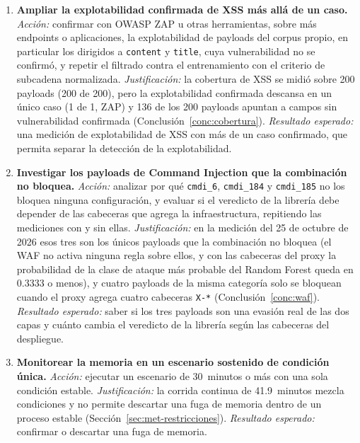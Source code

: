 \begin{enumerate}
        \item \textbf{Ampliar la explotabilidad confirmada de XSS más allá de un caso.}
    \textit{Acción:} confirmar con OWASP ZAP u otras herramientas, sobre más endpoints o
    aplicaciones, la explotabilidad de payloads del corpus propio, en particular los dirigidos a
    \texttt{content} y \texttt{title}, cuya vulnerabilidad no se confirmó, y repetir el filtrado
    contra el entrenamiento con el criterio de subcadena normalizada. \textit{Justificación:} la
    cobertura de XSS se midió sobre 200 payloads (200 de 200), pero la explotabilidad confirmada
    descansa en un único caso (1 de 1, ZAP) y 136 de los 200 payloads apuntan a campos sin
    vulnerabilidad confirmada (Conclusión~\ref{conc:cobertura}). \textit{Resultado esperado:} una
    medición de explotabilidad de XSS con más de un caso confirmado, que permita separar la
    detección de la explotabilidad.

    \item \textbf{Investigar los payloads de Command Injection que la combinación no bloquea.}
    \textit{Acción:} analizar por qué \texttt{cmdi\_6}, \texttt{cmdi\_184} y \texttt{cmdi\_185} no
    los bloquea ninguna configuración, y evaluar si el veredicto de la librería debe depender de
    las cabeceras que agrega la infraestructura, repitiendo las mediciones con y sin ellas.
    \textit{Justificación:} en la medición del 25 de octubre de 2026 esos tres son los únicos
    payloads que la combinación no bloquea (el WAF no activa ninguna regla sobre ellos, y con las
    cabeceras del proxy la probabilidad de la clase de ataque más probable del Random Forest queda
    en 0.3333 o menos), y cuatro payloads de la misma categoría solo se bloquean cuando el proxy
    agrega cuatro cabeceras \texttt{X-*} (Conclusión~\ref{conc:waf}). \textit{Resultado esperado:}
    saber si los tres payloads son una evasión real de las dos capas y cuánto cambia el veredicto
    de la librería según las cabeceras del despliegue.

    \item \textbf{Monitorear la memoria en un escenario sostenido de condición única.}
    \textit{Acción:} ejecutar un escenario de 30~minutos o más con una sola condición estable.
    \textit{Justificación:} la corrida continua de 41.9~minutos mezcla condiciones y no permite
    descartar una fuga de memoria dentro de un proceso estable (Sección~\ref{sec:met-restricciones}).
    \textit{Resultado esperado:} confirmar o descartar una fuga de memoria.


\end{enumerate}
